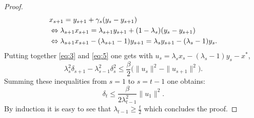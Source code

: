 \begin{proof}
\begin{align}
& x_{s+1} = y_{s+1} + \gamma_s (y_s - y_{s+1}) \notag \\
& \Leftrightarrow \lambda_{s+1} x_{s+1} = \lambda_{s+1} y_{s+1} + (1-\lambda_{s})(y_s - y_{s+1}) \notag \\
& \Leftrightarrow \lambda_{s+1} x_{s+1} - (\lambda_{s+1} - 1) y_{s+1}= \lambda_{s} y_{s+1} - (\lambda_{s}-1) y_{s} . \label{eq:5}
\end{align}
Putting together \eqref{eq:3} and \eqref{eq:5} one gets with $u_s = \lambda_{s} x_{s} - (\lambda_{s} - 1) y_{s} - x^*$,
$$\lambda_{s}^2 \delta_{s+1} - \lambda_{s-1}^2 \delta_s^2 \leq \frac{\beta}{2} \bigg(\|u_s\|^2 - \|u_{s+1}\|^2 \bigg) .$$
Summing these inequalities from $s=1$ to $s=t-1$ one obtains:
$$\delta_t \leq \frac{\beta}{2 \lambda_{t-1}^2} \|u_1\|^2.$$
By induction it is easy to see that $\lambda_{t-1} \geq \frac{t}{2}$ which concludes the proof.
\end{proof}